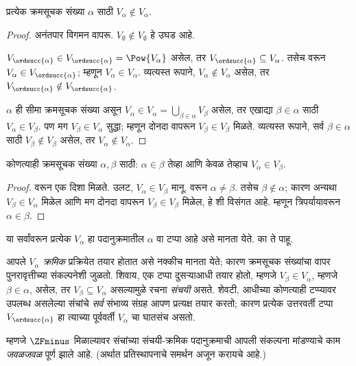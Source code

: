 \documentclass[../../../include/open-logic-section]{subfiles}
\begin{document}
\begin{lem}
प्रत्येक क्रमसूचक संख्या $\alpha$ साठी $V_\alpha \notin V_\alpha$.
\end{lem}

\begin{proof}
अनंतपार विगमन वापरू. $V_\emptyset \notin V_\emptyset$ हे उघड आहे.

$V_{\ordsucc{\alpha}} \in V_{\ordsucc{\alpha}} = \Pow{V_\alpha}$ असेल, तर $V_{\ordsucc{\alpha}} \subseteq V_\alpha$. तसेच  वरून $V_\alpha
\in V_{\ordsucc{\alpha}}$; म्हणून $V_\alpha \in V_\alpha$. व्यत्यस्त रूपाने, $V_\alpha \notin V_\alpha$ असेल, तर $V_{\ordsucc{\alpha}} \notin V_{\ordsucc{\alpha}}$.

$\alpha$ ही सीमा क्रमसूचक संख्या असून $V_\alpha \in V_\alpha = \bigcup_{\beta \in
\alpha}V_\beta$ असेल, तर एखाद्या $\beta \in \alpha$ साठी $V_\alpha \in V_\beta$. पण मग $V_\beta \in V_\alpha$ सुद्धा; म्हणून  दोनदा वापरून $V_\beta \in V_\beta$ मिळते. व्यत्यस्त रूपाने, सर्व $\beta \in \alpha$ साठी $V_\beta \notin V_\beta$ असेल, तर $V_\alpha \notin
V_\alpha$.
\end{proof}

\begin{cor}
कोणत्याही क्रमसूचक संख्या $\alpha, \beta$ साठी: $\alpha \in \beta$ तेव्हा आणि केवळ तेव्हाच $V_\alpha \in V_\beta$.
\end{cor}

\begin{proof}
 वरून एक दिशा मिळते. उलट, $V_\alpha \in V_\beta$ मानू.  वरून $\alpha \neq \beta$. तसेच $\beta \notin \alpha$; कारण अन्यथा $V_\beta \in V_\alpha$ मिळेल आणि मग  दोनदा वापरून $V_\beta \in V_\beta$ मिळेल, हे  शी विसंगत आहे. म्हणून त्रिपर्यायावरून $\alpha \in \beta$.
\end{proof}
\noindent
या सर्वांवरून प्रत्येक $V_\alpha$ हा पदानुक्रमातील $\alpha$ वा टप्पा आहे असे मानता येते. का ते पाहू.

आपले $V_\alpha$ \emph{क्रमिक} प्रक्रियेत तयार होतात असे नक्कीच मानता येते; कारण क्रमसूचक संख्यांचा वापर पुनरावृत्तीच्या संकल्पनेशी जुळतो. शिवाय, एक टप्पा दुसऱ्याआधी तयार होतो, म्हणजे $V_\beta \in V_\alpha$, म्हणजे $\beta \in \alpha$, असेल, तर $V_\beta \subseteq V_\alpha$ असल्यामुळे रचना \emph{संचयी} असते. शेवटी, आधीच्या कोणत्याही टप्प्यावर उपलब्ध असलेल्या संचांचे \emph{सर्व} संभाव्य संग्रह आपण प्रत्यक्ष तयार करतो; कारण प्रत्येक उत्तरवर्ती टप्पा $V_{\ordsucc{\alpha}}$ हा त्याच्या पूर्ववर्ती $V_\alpha$ चा घातसंच असतो.

म्हणजे $\ZFminus$ मिळाल्यावर संचांच्या संचयी-क्रमिक पदानुक्रमाची आपली संकल्पना मांडण्याचे काम \emph{जवळजवळ} पूर्ण झाले आहे. (अर्थात प्रतिस्थापनाचे समर्थन अजून करायचे आहे.)
\end{document}
